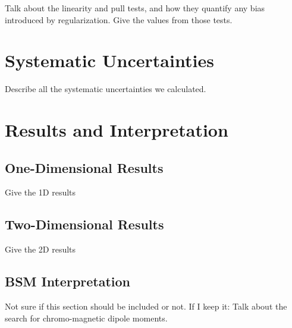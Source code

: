 Talk about the linearity and pull tests, and how they quantify any bias
introduced by regularization.
Give the values from those tests.

\section{Systematic Uncertainties}
\label{sec:afbsystematics}

Describe all the systematic uncertainties we calculated.

\section{Results and Interpretation}
\label{sec:afbresults}

\subsection{One-Dimensional Results}
\label{ssec:afbresults1d}

Give the 1D results

\subsection{Two-Dimensional Results}
\label{ssec:afbresults2d}

Give the 2D results

\subsection{BSM Interpretation}
\label{ssec:afbresultsbsm}

Not sure if this section should be included or not. If I keep it:
Talk about the search for chromo-magnetic dipole moments.

